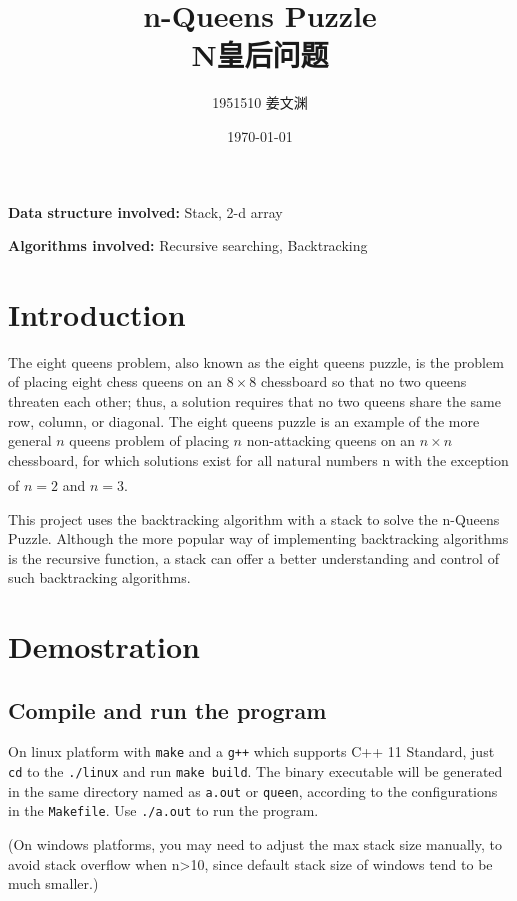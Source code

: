 \documentclass[cn,black,12pt,normal]{elegantnote}
\title{n-Queens Puzzle\\N皇后问题}
\author{1951510\; 姜文渊}
\institute{\small \url{https://github.com/jwyjohn/Jwy_DataStructureHomework}}
\date{\today}
\newcommand{\uct}[1]{\textsuperscript{\textsuperscript{\cite{#1}}}}
\begin{document}
\maketitle

\textbf{Data structure involved:} Stack, 2-d array

\textbf{Algorithms involved:} Recursive searching, Backtracking

\tableofcontents

\newpage

\section{Introduction}

The eight queens problem, also known as the eight queens puzzle, is the problem of placing eight chess queens on an $8 \times 8$ chessboard so that no two queens threaten each other; thus, a solution requires that no two queens share the same row, column, or diagonal. The eight queens puzzle is an example of the more general $n$ queens problem of placing $n$ non-attacking queens on an $n \times n$ chessboard, for which solutions exist for all natural numbers n with the exception of $n = 2$ and $n = 3$.\uct{wiki:Eight_queens_puzzle}

This project uses the backtracking algorithm with a stack to solve the n-Queens Puzzle. Although the more popular way of implementing backtracking algorithms is the recursive function, a stack can offer a better understanding and control of such backtracking algorithms.

\section{Demostration}

\subsection{Compile and run the program}

On linux platform with \lstinline{make} and a \lstinline{g++} which supports C++ 11 Standard, just \lstinline{cd} to the \lstinline{./linux} and run \lstinline{make build}. The binary executable will be generated in the same directory named as \lstinline{a.out} or \lstinline{queen}, according to the configurations in the \lstinline{Makefile}. Use \lstinline{./a.out} to run the program.

(On windows platforms, you may need to adjust the max stack size manually, to avoid stack overflow when n>10, since default stack size of windows tend to be much smaller.)
\end{document}
